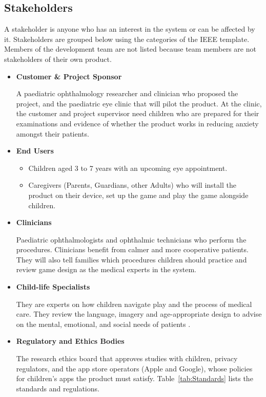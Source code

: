\documentclass[10pt]{article}
\begin{document}
\subsection{Stakeholders}\label{sec_Stakeholders}
A stakeholder is anyone who has an interest in the system or can be affected by it. 
Stakeholders are grouped below using the categories of the IEEE template. Members of the 
development team are not listed because team members are not stakeholders of their own product.
\begin{itemize}
\item \textbf{Customer \& Project Sponsor}

A paediatric ophthalmology researcher and clinician who proposed 
the project, and the paediatric eye clinic that will pilot the product. At the clinic, the customer
and project supervisor need children who are prepared for their examinations and evidence of whether 
the product works in reducing anxiety amongst their patients.

\item \textbf{End Users}
\begin{itemize}
    \item Children aged 3 to 7 years with an upcoming eye appointment.
    \item Caregivers (Parents, Guardians, other Adults) who will install the product on their device, set 
    up the game and play the game alongside children.
\end{itemize}

\item \textbf{Clinicians}

Paediatric ophthalmologists and ophthalmic technicians who perform the procedures. Clinicians benefit from calmer and more cooperative patients. They will also tell families which procedures children should 
practice and review game design as the medical experts in the system.

\item \textbf{Child-life Specialists}

They are experts on how children navigate play and the process of medical care. 
They review the language, imagery and age-appropriate design to advise on the mental, emotional, and social 
needs of patients \cite{mayoChildLifeSpecialist}.

\item \textbf{Regulatory and Ethics Bodies}

The research ethics board that approves studies with children, privacy regulators, and the app store operators 
(Apple and Google), whose policies for children's apps the product must satisfy.
Table~\ref{tab:Standards} lists the standards and regulations.


\end{itemize}
\end{document}
